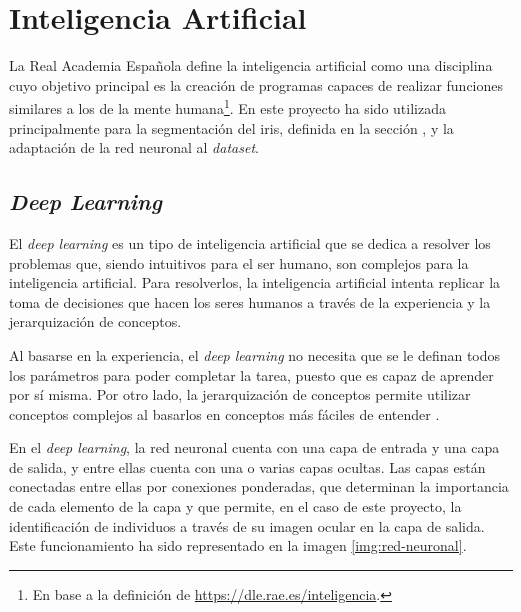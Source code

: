 \section{Inteligencia Artificial}

La Real Academia Española define la inteligencia artificial como una disciplina cuyo objetivo principal es la creación de programas capaces de realizar funciones similares a los de la mente humana\footnote{En base a la definición de \url{https://dle.rae.es/inteligencia}.}. 
En este proyecto ha sido utilizada principalmente para la segmentación del iris, definida en la sección , y la adaptación de la red neuronal al \textit{dataset}.

\subsection{\textit{Deep Learning}}

El \textit{deep learning} es un tipo de inteligencia artificial que se dedica a resolver los problemas que, siendo intuitivos para el ser humano, son complejos para la inteligencia artificial. Para resolverlos, la inteligencia artificial intenta replicar la toma de decisiones que hacen los seres humanos a través de la experiencia y la jerarquización de conceptos. 

Al basarse en la experiencia, el \textit{deep learning} no necesita que se le definan todos los parámetros para poder completar la tarea, puesto que es capaz de aprender por sí misma. Por otro lado, la jerarquización de conceptos permite utilizar conceptos complejos 
al basarlos en conceptos más fáciles de entender \cite{Goodfellow-et-al-2016}.

En el \textit{deep learning}, la red neuronal cuenta con una capa de entrada y una capa de salida, y entre ellas cuenta con una o varias capas ocultas. 
Las capas están conectadas entre ellas por conexiones ponderadas, que determinan la importancia de cada elemento de la capa y que permite, en el caso de este proyecto, la identificación de individuos a través de su imagen ocular en la capa de salida. Este funcionamiento ha sido representado en la imagen \ref{img:red-neuronal}.



